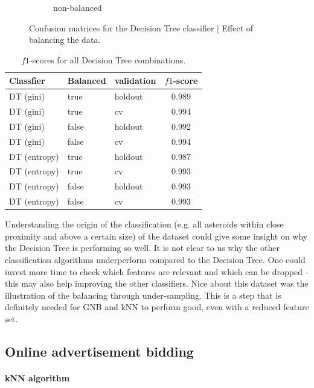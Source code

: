 \documentclass{article}
\begin{document}
\begin{figure}[h!]
\begin{subfigure}{.5\textwidth}
		\caption{non-balanced}
	\end{subfigure}
	\caption{Confusion matrices for the Decision Tree classifier | Effect of balancing the data.}
	\label{fig:conf_matr_asteroids_bal_vs_nonbal}
\end{figure}

\begin{table}[h!]
		\centering
    \begin{tabular}{ l l l c }
        \toprule
        \textbf{Classfier} & \textbf{Balanced} & \textbf{validation} & \textbf{$f1$-score} \\
        \toprule
        DT (gini) & true & holdout & 0.989 \\
				DT (gini) & true & cv & 0.994 \\
        DT (gini) & false & holdout & 0.992 \\
				DT (gini) & false & cv & 0.994 \\
				DT (entropy) & true & holdout & 0.987 \\
				DT (entropy) & true & cv & 0.993 \\
				DT (entropy) & false & holdout & 0.993 \\
        DT (entropy) & false & cv & 0.993 \\
        \bottomrule
    \end{tabular}
		\caption{$f1$-scores for all Decision Tree combinations.}
		\label{tab:dec_tree_perf_ast}
\end{table}

Understanding the origin of the classification (e.g. all asteroids within close proximity and above a certain size) of the dataset could give some insight on why the Decision Tree is performing so well. It is not clear to us why the other classification algorithms underperform compared to the Decision Tree. One could invest more time to check which features are relevant and which can be dropped - this may also help improving the other classifiers. Nice about this dataset was the illustration of the balancing through under-sampling. This is a step that is definitely needed for GNB and kNN to perform good, even with a reduced feature set.


\subsection{Online advertisement bidding}

\paragraph{kNN algorithm }
\end{document}
